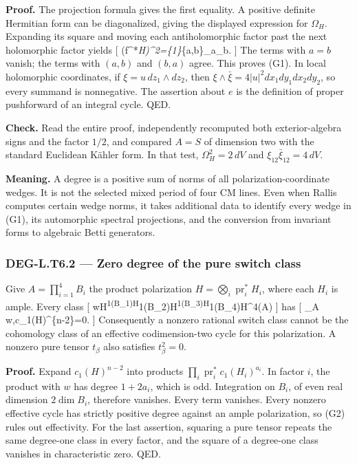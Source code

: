 \documentclass[11pt,a4paper]{article}
\theoremstyle{definition}
\begin{document}
\textbf{Proof.} The projection formula gives the first equality. A
positive definite Hermitian form can be diagonalized, giving the
displayed expression for \(\Omega_H\). Expanding its square and moving
each antiholomorphic factor past the next holomorphic factor yields {[}
(f\^{}*\Omega\emph{H)\^{}2=\{1\}\sum}\{a,b\}\eta\_a\wedge\eta\_b\wedge{}\wedge{}.
{]} The terms with \(a=b\) vanish; the terms with \((a,b)\) and
\((b,a)\) agree. This proves (G1). In local holomorphic coordinates, if
\(\xi=u\,dz_1\wedge dz_2\), then
\(\xi\wedge\bar\xi=4|u|^2dx_1dy_1dx_2dy_2\), so every summand is
nonnegative. The assertion about \(e\) is the definition of proper
pushforward of an integral cycle. QED.

\textbf{Check.} Read the entire proof, independently recomputed both
exterior-algebra signs and the factor \(1/2\), and compared \(A=S\) of
dimension two with the standard Euclidean Kähler form. In that test,
\(\Omega_H^2=2\,dV\) and \(\xi_{12}\bar\xi_{12}=4\,dV\).

\textbf{Meaning.} A degree is a positive sum of norms of all
polarization-coordinate wedges. It is not the selected mixed period of
four CM lines. Even when Rallis computes certain wedge norms, it takes
additional data to identify every wedge in (G1), its automorphic
spectral projections, and the conversion from invariant forms to
algebraic Betti generators.

\subsubsection{DEG-L.T6.2 --- Zero degree of the pure switch
class}\label{deg-l.t6.2-zero-degree-of-the-pure-switch-class}

Give \(A=\prod_{i=1}^4B_i\) the product polarization
\(H=\bigotimes_i\operatorname{pr}_i^*H_i\), where each \(H_i\) is ample.
Every class {[}
w\in H\textsuperscript{1(B\_1)\otimes H}1(B\_2)\otimes H\textsuperscript{1(B\_3)\otimes H}1(B\_4)\subset H\^{}4(A)
{]} has {[} \int\_A w,c\_1(H)\^{}\{n-2\}=0.  {]} Consequently a
nonzero rational switch class cannot be the cohomology class of an
effective codimension-two cycle for this polarization. A nonzero pure
tensor \(t_\beta\) also satisfies \(t_\beta^2=0\).

\textbf{Proof.} Expand \(c_1(H)^{n-2}\) into products
\(\prod_i\operatorname{pr}_i^*c_1(H_i)^{a_i}\). In factor \(i\), the
product with \(w\) has degree \(1+2a_i\), which is odd. Integration on
\(B_i\), of even real dimension \(2\dim B_i\), therefore vanishes. Every
term vanishes. Every nonzero effective cycle has strictly positive
degree against an ample polarization, so (G2) rules out effectivity. For
the last assertion, squaring a pure tensor repeats the same degree-one
class in every factor, and the square of a degree-one class vanishes in
characteristic zero. QED.
\end{document}
